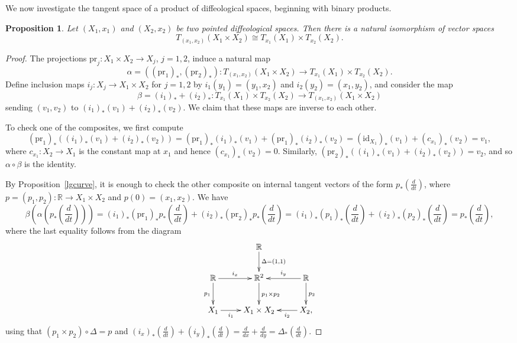\documentclass{amsart}
\newtheorem{prop}[de]{Proposition}
\theoremstyle{remark}
\newcommand{\ra}{\to}
\newcommand{\ddt}{{\textstyle\frac{d}{dt}}}
\newcommand{\pr}{{\mathrm{pr}}}
\newcommand{\id}{{\mathrm{id}}}
\def \R{\mathbb{R}}
\begin{document}
We now investigate the tangent space of a product of diffeological spaces,
beginning with binary products.

\begin{prop}\label{product}
Let $(X_1,x_1)$ and $(X_2,x_2)$ be two pointed diffeological spaces.
Then there is a natural isomorphism of vector spaces
\[
T_{(x_1,x_2)}(X_1 \times X_2) \cong T_{x_1}(X_1) \times T_{x_2}(X_2).
\]
\end{prop}
\begin{proof}
The projections $\pr_j : X_1 \times X_2 \to X_j$, $j = 1, 2$, induce a natural map
\[ \alpha = ((\pr_1)_*, (\pr_2)_*) : T_{(x_1,x_2)}(X_1 \times X_2) \ra T_{x_1}(X_1) \times T_{x_2}(X_2). \]
Define inclusion maps $i_j : X_j \to X_1 \times X_2$ for $j = 1, 2$ by $i_1(y_1) = (y_1, x_2)$ and $i_2(y_2)=(x_1,y_2)$,
and consider the map
\[ \beta = (i_1)_* + (i_2)_* : T_{x_1}(X_1) \times T_{x_2}(X_2) \to T_{(x_1,x_2)}(X_1 \times X_2) \]
sending $(v_1, v_2)$ to $(i_1)_*(v_1) + (i_2)_*(v_2)$.
We claim that these maps are inverse to each other.

To check one of the composites, we first compute
\[
  (\pr_1)_*((i_1)_*(v_1) + (i_2)_*(v_2)) = (\pr_1)_* (i_1)_*(v_1) + (\pr_1)_* (i_2)_*(v_2)
= (\id_{X_1})_* (v_1) + (c_{x_1})_* (v_2) = v_1,
\]
where $c_{x_1} : X_2 \to X_1$ is the constant map at $x_1$ and hence $(c_{x_1})_* (v_2) = 0$.
Similarly, $(\pr_2)_*((i_1)_*(v_1) + (i_2)_*(v_2)) = v_2$, and so
$\alpha \circ \beta$ is the identity.

By Proposition~\ref{lgcurve}, it is enough to check the other composite
on internal tangent vectors of the form $p_*(\ddt)$, where $p = (p_1, p_2) : \R \to X_1 \times X_2$
and $p(0) = (x_1, x_2)$.
We have
\[
  \beta(\alpha(p_*(\ddt))) = (i_1)_* (\pr_1)_* p_*(\ddt) + (i_2)_* (\pr_2)_* p_* (\ddt)
= (i_1)_* (p_1)_* (\ddt) + (i_2)_* (p_2)_* (\ddt) = p_*(\ddt),
\]
where the last equality follows from the diagram
\[
  \xymatrix{
                                  & \R \ar[d]^-{\Delta = (1,1)}   & \\
    \R \ar[r]^-{i_x} \ar[d]_{p_1} & \R^2 \ar[d]^{p_1 \times p_2} & \R \ar[l]_-{i_y} \ar[d]^{p_2} \\
    X_1 \ar[r]_-{i_1}             & X_1 \times X_2               & X_2 , \ar[l]^-{i_2} \\
  }
\]
using that $(p_1 \times p_2) \circ \Delta = p$ and
$(i_x)_*(\ddt) + (i_y)_*(\ddt) = \frac{d}{dx} + \frac{d}{dy} = \Delta_*(\ddt)$.
\end{proof}
\end{document}
